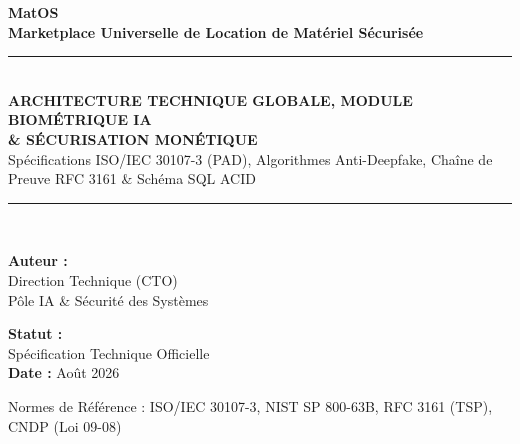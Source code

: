 \documentclass[11pt,a4paper]{report}
\begin{document}
\begin{titlepage}
    \centering
    \vspace*{1.5cm}
    {\Huge\bfseries\color{primaryNavy} MatOS}\\[0.4cm]
    {\LARGE\bfseries\color{accentTeal} Marketplace Universelle de Location de Matériel Sécurisée}\\[1.5cm]
    
    \rule{\linewidth}{1.8pt}\\[0.4cm]
    {\huge\bfseries ARCHITECTURE TECHNIQUE GLOBALE, MODULE BIOMÉTRIQUE IA\\\& SÉCURISATION MONÉTIQUE}\\[0.3cm]
    {\large Spécifications ISO/IEC 30107-3 (PAD), Algorithmes Anti-Deepfake, Chaîne de Preuve RFC 3161 \& Schéma SQL ACID}\\[0.4cm]
    \rule{\linewidth}{1.8pt}\\[2.2cm]
    
    \begin{minipage}{0.45\textwidth}
        \begin{flushleft} \large
            \textbf{Auteur :}\\
            Direction Technique (CTO)\\
            Pôle IA \& Sécurité des Systèmes
        \end{flushleft}
    \end{minipage}
    \hfill
    \begin{minipage}{0.45\textwidth}
        \begin{flushright} \large
            \textbf{Statut :}\\
            Spécification Technique Officielle\\
            \textbf{Date :} Août 2026
        \end{flushright}
    \end{minipage}
    
    \vfill
    {\small Normes de Référence : ISO/IEC 30107-3, NIST SP 800-63B, RFC 3161 (TSP), CNDP (Loi 09-08)}
\end{titlepage}

\tableofcontents
\newpage
\end{document}
